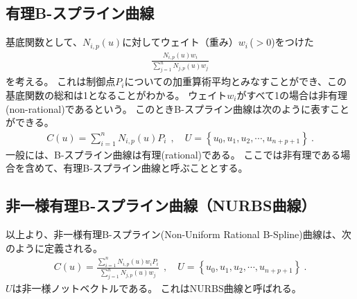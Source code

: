 \subsection{有理B-スプライン曲線}
基底関数として、$N_{i, p}(u)$に対してウェイト（重み）$w_i$\,($>0$)をつけた
\begin{align*}
  \frac{N_{i, p}(u)w_i}{\displaystyle\sum_{j=1}^nN_{j, p}(u)w_j}
\end{align*}
を考える。
これは制御点$P_i$についての加重算術平均とみなすことができ、この基底関数の総和は1となることがわかる。
ウェイト$w_i$がすべて1の場合は非有理(non-rational)であるという。
このときB-スプライン曲線は次のように表すことができる。
\begin{align*}
  C(u) = \sum_{i=1}^nN_{i, p}(u)P_i~~, \quad
  U = \left\{u_0, u_1, u_2, \cdots, u_{n+p+1}\right\}\ .
\end{align*}
一般には、B-スプライン曲線は有理(rational)である。
ここでは非有理である場合を含めて、有理B-スプライン曲線と呼ぶこととする。


\subsection{非一様有理B-スプライン曲線（NURBS曲線）}
以上より、非一様有理B-スプライン(Non-Uniform Rational B-Spline)曲線は、次のように定義される。
\begin{align*}
  C(u) = \frac{\displaystyle\sum_{i=1}^nN_{i, p}(u)w_iP_i}{\displaystyle\sum_{j=1}^nN_{j, p}(u)w_j}~~,\quad
  U = \left\{u_0, u_1, u_2, \cdots, u_{n+p+1}\right\}\ .
\end{align*}
$U$は非一様ノットベクトルである。
これはNURBS曲線と呼ばれる。

